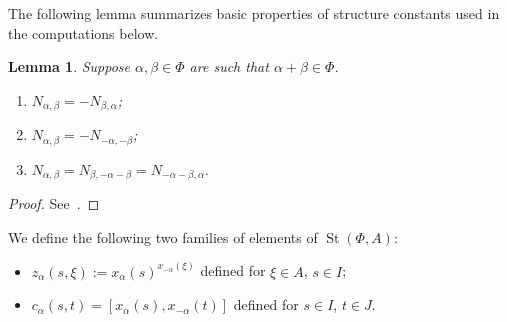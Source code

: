 \documentclass[oneside, 8pt]{amsart}
\newtheorem{lemma}{Lemma}
\theoremstyle{remark}
\theoremstyle{definition}
\DeclareMathOperator{\St}{St}
\numberwithin{equation}{section}
\begin{document}
The following lemma summarizes basic properties of structure constants used in the computations below.
\begin{lemma} Suppose $\alpha, \beta \in \Phi$ are such that $\alpha+\beta \in \Phi$.
\begin{enumerate}\label{lem:structure-constants}
 \item $N_{\alpha, \beta} = -N_{\beta,\alpha}$;
 \item $N_{\alpha, \beta} = - N_{-\alpha, -\beta}$;
 \item $N_{\alpha, \beta} = N_{\beta, -\alpha-\beta} = N_{-\alpha-\beta, \alpha}.$
\end{enumerate}
\end{lemma}
\begin{proof} See~\cite[\S~14]{VP}. \end{proof}

We define the following two families of elements of $\St(\Phi, A)$:
\begin{itemize}
 \item $z_\alpha(s, \xi) := x_\alpha(s)^{x_{-\alpha}(\xi)}$ defined for $\xi \in A$, $s \in I$;
 \item $c_\alpha(s, t) = [x_\alpha(s), x_{-\alpha}(t)]$ defined for $s \in I$, $t \in J$.
\end{itemize}
\end{document}
